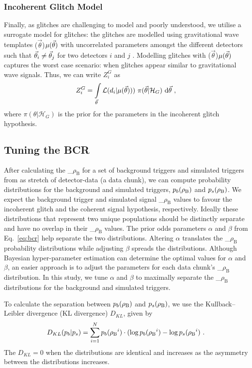 \documentclass[%
 amsmath,amssymb,
 aps,
twocolumn
]{revtex4}
\newcommand{\mathcmd}[1]{{\sc \relax\ifmmode#1\else $#1$\fi}\xspace}
\newcommand{\bcr}{\mathcmd{\rho_\text{B}}}
\newcommand{\parameters}{\mathcmd{\vec{\theta}}}
\newcommand{\template}{\mathcmd{\mu(\parameters)}}
\begin{document}
\subsubsection{Incoherent Glitch Model}
Finally, as glitches are challenging to model and poorly understood, we utilise a surrogate model for glitches: the glitches are modelled using gravitational wave templates  \template with uncorrelated  parameters amongst the different detectors such that  $\parameters_i \neq \parameters_j$ for two detectors $i$ and $j$ \cite{bci}.  Modelling glitches with \template captures the worst case scenario: when glitches appear similar to gravitational wave signals. Thus, we can write $Z^G_i$ as 
\begin{equation}
\label{eq:zg}
Z^G_i = \int\limits_{\parameters} \mathcal{L}(d_i|\template))\ \pi(\parameters| \mathcal{H}_G)\  \text{d}\parameters  \ ,
\end{equation}
where $\pi(\theta| \mathcal{H}_G)$ is the prior for the parameters in the incoherent glitch hypothesis. 

\subsection{Tuning the BCR}

After calculating the \bcr for a set of background triggers and simulated triggers from as stretch of detector-data (a data chunk), we can compute probability distributions for the background and simulated triggers, $p_b(\bcr)$ and $p_s(\bcr)$. We expect the background trigger and simulated signal \bcr values to favour the incoherent glitch and the coherent signal hypothesis, respectively. Ideally these distributions that represent two unique populations should be distinctly separate and have no overlap in their \bcr values. The prior odds parameters $\alpha$ and $\beta$ from Eq.~\ref{eq:bcr} help separate the two distributions. Altering $\alpha$ translates the \bcr probability distributions while adjusting $\beta$ spreads the distributions. Although Bayesian hyper-parameter estimation can determine the optimal values for $\alpha$ and $\beta$, an easier approach is to adjust the parameters for each data chunk's \bcr distribution. In this study, we tune $\alpha$ and $\beta$ to maximally separate the \bcr distributions for the background and simulated triggers. 

To calculate the separation between $p_b(\bcr)$ and $p_s(\bcr)$, we use the Kullback--Leibler divergence (KL divergence) $D_{KL}$, given by
\begin{equation}
    D_{KL}(p_b | p_s) = \sum\limits_{i=1}^N p_b(\bcr^i) \cdot (\log p_b(\bcr^i) - \log p_s(\bcr^i) \ .
\end{equation}
The $D_{KL}=0$ when the distributions are identical and increases as the asymmetry between the distributions increases. 
\end{document}
